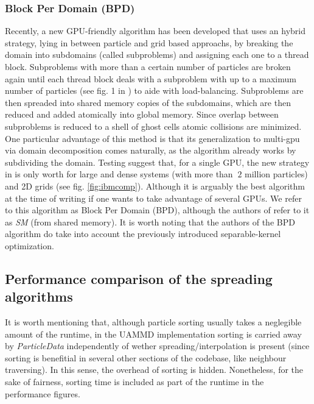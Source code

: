 \documentclass[ twoside,openright,titlepage,numbers=noenddot,%
headinclude,footinclude,cleardoublepage=empty,abstract=on,
BCOR=5mm,paper=a4,fontsize=11pt, dvipsnames
]{scrreprt}
\newcommand{\uammd}{\gls{UAMMD}\xspace}
\newcommand{\gpu}{\gls{GPU}\xspace}
\begin{document}
\subsubsection*{Block Per Domain (BPD)}
Recently, a new \gpu-friendly algorithm has been developed\cite{Shih2021} that uses an hybrid strategy, lying in between particle and grid based approachs, by breaking the domain into subdomains (called subproblems) and assigning each one to a thread block. Subproblems with more than a certain number of particles are broken again until each thread block deals with a subproblem with up to a maximum number of particles (see fig. 1 in \cite{Shih2021}) to aide with load-balancing. Subproblems are then spreaded into shared memory copies of the subdomains, which are then reduced and added atomically into global memory. Since overlap between subproblems is reduced to a shell of ghost cells atomic collisions are minimized. One particular advantage of this method is that its generalization to multi-gpu via domain decomposition comes naturally, as the algorithm already works by subdividing the domain. Testing suggest that, for a single \gpu, the new strategy in \cite{Shih2021} is only worth for large and dense systems (with more than $~2$ million particles) and 2D grids (see fig. \ref{fig:ibmcomp}). Although it is arguably the best algorithm at the time of writing if one wants to take advantage of several GPUs.
We refer to this algorithm as Block Per Domain (BPD), although the authors of \cite{Shih2021} refer to it as \emph{SM} (from shared memory). It is worth noting that the authors of the BPD algorithm do take into account the previously introduced separable-kernel optimization.

\subsection*{Performance comparison of the spreading algorithms}
It is worth mentioning that, although particle sorting usually takes a neglegible amount of the runtime, in the \uammd implementation sorting is carried away by \emph{ParticleData} independently of wether spreading/interpolation is present (since sorting is benefitial in several other sections of the codebase, like neighbour traversing). In this sense, the overhead of sorting is hidden. Nonetheless, for the sake of fairness, sorting time is included as part of the runtime in the performance figures.
\end{document}
